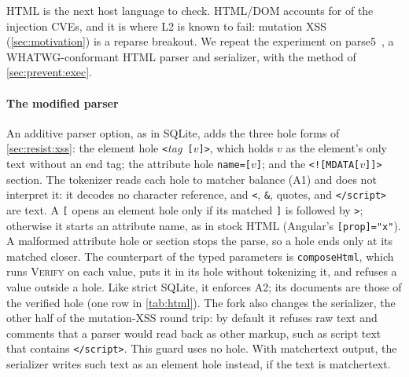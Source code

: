 HTML is the next host language to check. HTML/DOM accounts for \dataHtmlDomCVEs of
the injection CVEs, and it is where L2 is known to fail: mutation XSS
(\cref{sec:motivation}) is a reparse breakout. We repeat the experiment on
parse5~\cite{parse5}, a WHATWG-conformant HTML parser and serializer, with the
method of \cref{sec:prevent:exec}.

\paragraph{The modified parser}
An additive parser option, as in SQLite, adds the three hole forms of
\cref{sec:resist:xss}: the element hole \verb|<|\emph{tag}\verb| [|$v$\verb|]>|,
which holds $v$ as the element's only text without an end tag; the attribute hole
\verb|name=[|$v$\verb|]|; and the \verb|<![MDATA[|$v$\verb|]]>| section.
The tokenizer reads each hole to matcher balance (A1) and does not interpret it: it
decodes no character reference, and \verb|<|, \verb|&|, quotes, and
\verb|</script>| are text.
A \verb|[| opens an element hole only if its matched \verb|]| is followed by
\verb|>|; otherwise it starts an attribute name, as in stock HTML (Angular's
\verb|[prop]="x"|). A malformed attribute hole or section stops the parse, so a
hole ends only at its matched closer.
The counterpart of the typed parameters is \texttt{composeHtml}, which runs \textsc{Verify} on each value, puts it in its hole
without tokenizing it, and refuses a value outside a hole. Like strict SQLite, it
enforces A2; its documents are those of the verified hole (one row in
\cref{tab:html}).
The fork also changes the serializer, the other half of the mutation-XSS round
trip: by default it refuses raw text and comments that a parser would read back as
other markup, such as script text that contains \verb|</script>|. This guard uses
no hole. With matchertext output, the serializer writes such text as an element
hole instead, if the text is matchertext.

